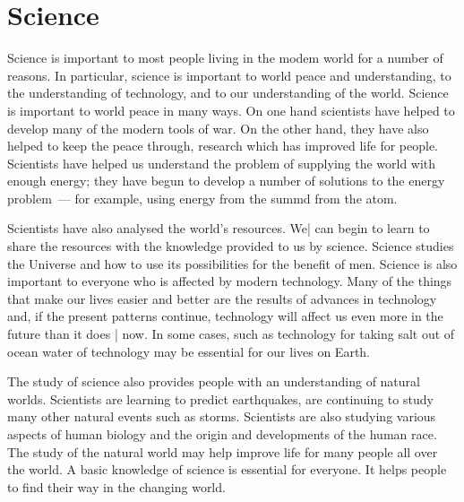 \documentclass[a4paper]{article}
\begin{document}
\section{Science}

Science is important to most people living in the modem world for a number of
reasons. In particular, science is important to world peace and understanding,
to the understanding of technology, and to our understanding of the world.
Science is important to world peace in many ways. On one hand scientists have
helped to develop many of the modern tools of war. On the other hand, they have
also helped to keep the peace through, research which has improved life for
people. Scientists have helped us understand the problem of supplying the world
with enough energy; they have begun to develop a number of solutions to the
energy problem~--- for example, using energy from the summd from the atom.

Scientists have also analysed the world's resources. We| can begin to learn to
share the resources with the knowledge provided to us by science. Science
studies the Universe and how to use its possibilities for the benefit of men.
Science is also important to everyone who is affected by modern technology. Many
of the things that make our lives easier and better are the results of advances
in technology and, if the present patterns continue, technology will affect us
even more in the future than it does | now. In some cases, such as technology
for taking salt out of ocean water of technology may be essential for our lives
on Earth.

The study of science also provides people with an understanding of
natural worlds. Scientists are learning to predict earthquakes, are continuing
to study many other natural events such as storms. Scientists are also studying
various aspects of human biology and the origin and developments of the human
race. The study of the natural world may help improve life for many people all
over the world. A basic knowledge of science is essential for everyone. It helps
people to find their way in the changing world.
\end{document}
